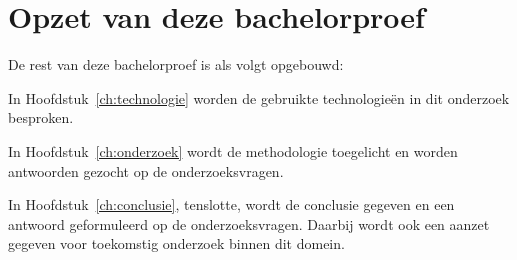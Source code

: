
\section{Opzet van deze bachelorproef}
\label{sec:opzet-bachelorproef}


De rest van deze bachelorproef is als volgt opgebouwd:

In Hoofdstuk~\ref{ch:technologie} worden de gebruikte technologieën in dit onderzoek besproken.

In Hoofdstuk~\ref{ch:onderzoek} wordt de methodologie toegelicht en worden antwoorden gezocht op de onderzoeksvragen.

In Hoofdstuk~\ref{ch:conclusie}, tenslotte, wordt de conclusie gegeven en een antwoord geformuleerd op de onderzoeksvragen. Daarbij wordt ook een aanzet gegeven voor toekomstig onderzoek binnen dit domein.

